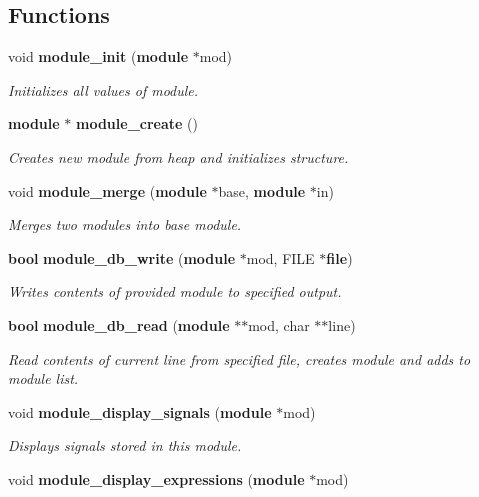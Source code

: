 \subsection*{Functions}
\begin{CompactItemize}
\item 
void {\bf module\_\-init} ({\bf module} $\ast$mod)
\begin{CompactList}\small\item\em Initializes all values of module.\item\end{CompactList}\item 
{\bf module} $\ast$ {\bf module\_\-create} ()
\begin{CompactList}\small\item\em Creates new module from heap and initializes structure.\item\end{CompactList}\item 
void {\bf module\_\-merge} ({\bf module} $\ast$base, {\bf module} $\ast$in)
\begin{CompactList}\small\item\em Merges two modules into base module.\item\end{CompactList}\item 
{\bf bool} {\bf module\_\-db\_\-write} ({\bf module} $\ast$mod, FILE $\ast${\bf file})
\begin{CompactList}\small\item\em Writes contents of provided module to specified output.\item\end{CompactList}\item 
{\bf bool} {\bf module\_\-db\_\-read} ({\bf module} $\ast$$\ast$mod, char $\ast$$\ast$line)
\begin{CompactList}\small\item\em Read contents of current line from specified file, creates module and adds to module list.\item\end{CompactList}\item 
void {\bf module\_\-display\_\-signals} ({\bf module} $\ast$mod)
\begin{CompactList}\small\item\em Displays signals stored in this module.\item\end{CompactList}\item 
void {\bf module\_\-display\_\-expressions} ({\bf module} $\ast$mod)

\end{CompactItemize}
